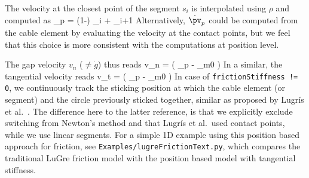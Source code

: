     The velocity at the closest point of the segment $s_i$ is interpolated using $\rho$ and computed as
    \be
      \dot \pv_p = (1-\rho) \cdot \vv_i + \rho \cdot \vv_{i+1}
    \ee
    Alternatively, $\dot \pv_p$ could be computed from the cable element by evaluating the velocity at the contact points, but we feel that
    this choice is more consistent with the computations at position level.
    
    The gap velocity $v_n$ ($\neq \dot g$) thus reads
    \be
      v_n = \left( \dot \pv_p - \dot \pv_{m0} \right) \nv
    \ee
    In a similar, the tangential velocity reads
    \be \label{ObjectContactFrictionCircleCable2D:vTangent}
      v_t = \left( \dot \pv_p - \dot \pv_{m0} \right) \tv
    \ee
    In case of \texttt{frictionStiffness != 0}, we continuously track the sticking position at which the cable element (or segment) and the circle 
    previously sticked together, similar as proposed by Lugr{\'i}s et al.~\cite{LugrisEscalonaDC2011}. 
    The difference here to the latter reference, is that we explicitly exclude switching from Newton's method and that Lugr{\'i}s et al.~used
    contact points, while we use linear segments.
    For a simple 1D example using this position based approach for friction, see \texttt{Examples/lugreFrictionText.py}, 
    which compares the traditional LuGre friction model \cite{CanudasDeWitEtAl1993} with the position based model with tangential stiffness. 
    
